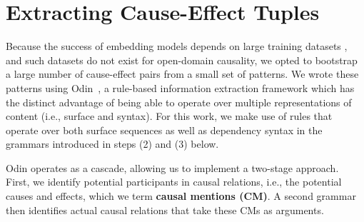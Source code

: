 
\section{Extracting Cause-Effect Tuples}
\label{sec:causalextraction}


Because the success of embedding models depends on large training datasets \cite{sharp2015spinning}, and such datasets do not exist for open-domain causality, we opted to bootstrap a large number of cause-effect pairs from a small set of patterns.
%
We wrote these patterns using Odin~\cite{valenzuela2016runes}, a rule-based information extraction framework which has the distinct advantage of 
being able to operate over multiple representations of content (i.e., surface and syntax).
For this work, we make use of rules that operate over both surface sequences as well as dependency syntax in the grammars introduced in steps (2) and (3) below.

Odin operates as a cascade, %
allowing us to implement a two-stage approach.
First, we identify potential participants in causal relations, i.e., the potential causes and effects, which we term {\bf causal mentions (CM)}. A second grammar then identifies actual causal relations that take these CMs as arguments.

